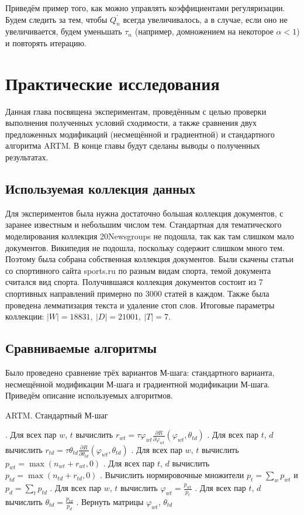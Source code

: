 \documentclass[12pt]{article}
\newenvironment{rusalgorithm}[1][htb]
  {\renewcommand{\algorithmcfname}{Алгоритм}
   \begin{algorithm}[#1]
  }{\end{algorithm}}
\renewcommand{\phi}{\varphi}
\begin{document}
Приведём пример того, как можно управлять коэффициентами регуляризации. Будем следить за тем, чтобы $Q^{\prime}_n$ всегда увеличивалось, а в случае, если оно не увеличивается, будем уменьшать $\tau_n$ (например, домножением на некоторое $\alpha < 1$) и повторять итерацию.

	\section{Практические исследования}
Данная глава посвящена экспериментам, проведённым с целью проверки выполнения полученных условий сходимости, а также сравнения двух предложенных модификаций (несмещённой и градиентной) и стандартного алгоритма ARTM. В конце  главы будут сделаны выводы о полученных результатах.
\subsection{Используемая коллекция данных}
Для экспериментов была нужна достаточно большая коллекция документов, с заранее известным  и небольшим числом тем. Стандартная для тематического моделирования  коллекция 20Newsgroups не подошла, так как там слишком мало документов. Википедия не подошла, поскольку содержит слишком много тем. Поэтому была собрана собственная коллекция документов. Были скачены статьи со спортивного сайта sports.ru по разным видам спорта, темой документа считался вид спорта. Получившаяся коллекция документов состоит из 7 спортивных направлений примерно по 3000 статей в каждом. Также была проведена лемматизация текста и удаление стоп слов. Итоговые параметры коллекции: $|W| = 18831,~|D| = 21001,~|T| = 7$.
	\subsection{Сравниваемые алгоритмы}
Было проведено сравнение трёх вариантов М-шага: стандартного варианта, несмещённой модификации М-шага и градиентной модификации М-шага. Приведём описание используемых алгоритмов.

\begin{rusalgorithm}[H]
\caption{ARTM. Стандартный М-шаг}\label{malgo1}
\begin{algorithmic}[]
\Procedure{MStep}{$n_{wt}$, $n_{td}$, $\phi_{wt}$, $\theta_{td}$}
. Для всех пар $w$, $t$ вычислить $r_{wt} = \tau \phi_{wt} \frac{\partial{R}}{\partial{\phi_{wt}}}(\phi_{wt}, \theta_{td})$
. Для всех пар $t$, $d$ вычислить $r_{td} =\tau  \theta_{td} \frac{\partial{R}}{\partial{\theta_{td}}}(\phi_{wt}, \theta_{td})$
. Для всех пар $w$, $t$ вычислить $p_{wt} = \max(n_{wt} + r_{wt}, 0)$
. Для всех пар $t$, $d$ вычислить $p_{td} = \max(n_{td} + r_{td}, 0)$
. Вычислить нормировочные множители $p_t = \sum_w p_{wt}$ и $p_d = \sum_t p_{td}$
. Для всех пар $w$, $t$ вычислить $\phi_{wt} = \frac{p_{wt}}{p_t}$
. Для всех пар $t$, $d$ вычислить $\theta_{td} = \frac{p_{td}}{p_d}$
. Вернуть матрицы $\phi_{wt}$, $\theta_{td}$
\EndProcedure
\end{algorithmic}
\end{rusalgorithm}
\newpage
\end{document}
